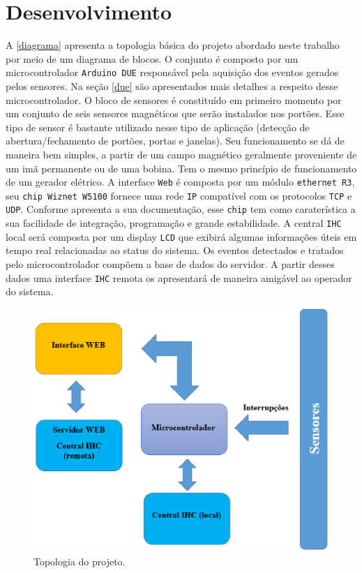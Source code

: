 \chapter[Desenvolvimento]{Desenvolvimento}


A \autoref{diagrama} apresenta a topologia básica do projeto abordado neste trabalho por meio de um diagrama de blocos. 
O conjunto é composto por um microcontrolador \texttt{Arduino DUE} responsável pela aquisição dos eventos gerados pelos sensores.
Na seção \ref{due} são apresentados mais detalhes a respeito desse microcontrolador. O bloco de sensores é constituído em primeiro momento 
por um conjunto de seis sensores magnéticos que serão instalados nos portões. Esse tipo de sensor é bastante utilizado nesse tipo de aplicação
(detecção de abertura/fechamento de portões, portas e janelas). Seu funcionamento se dá de maneira bem simples, a partir de um campo magnético 
geralmente proveniente de um imã permanente ou de uma bobina. Tem o mesmo princípio de funcionamento de um gerador elétrico. A interface \texttt{Web} é 
composta por um módulo \texttt{ethernet R3}, seu \texttt{chip Wiznet W5100} fornece uma rede \texttt{IP} compatível com os protocolos \texttt{TCP} e \texttt{UDP}. Conforme apresenta a sua
documentação, esse \texttt{chip} tem como caraterística a sua facilidade de integração, programação e grande estabilidade. A central \texttt{IHC} local será composta
por um display \texttt{LCD} que exibirá algumas informações úteis em tempo real relacionadas ao status do sistema. Os eventos detectados e tratados pelo
microcontrolador compõem a base de dados do servidor.  A partir desses dados uma interface \texttt{IHC} remota os apresentará de maneira amigável ao operador
do sistema. 

\begin{figure}[h]
	\centering
	\caption{\label{diagrama}Topologia do projeto.}
		\includegraphics[keepaspectratio=true,scale=0.7]{figuras/diagrama.eps}
\end{figure}


